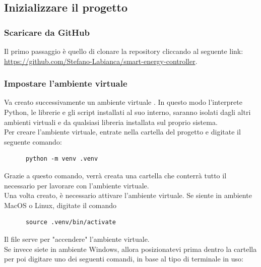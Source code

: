 \documentclass[12pt, letterpaper]{article}
\begin{document}
\subsection{Inizializzare il progetto}

\subsubsection{Scaricare da GitHub}

Il primo passaggio è quello di clonare la repository cliccando al seguente link:
\url{https://github.com/Stefano-Labianca/smart-energy-controller}. \\

\subsubsection{Impostare l'ambiente virtuale}

\noindent Va creato successivamente un ambiente virtuale \cite{create-venv}. In questo modo l'interprete Python,
le librerie e gli script installati al suo interno, saranno isolati dagli altri ambienti
virtuali e da qualsiasi libreria installata sul proprio sistema. \\

\noindent Per creare l'ambiente virtuale, entrate nella cartella del progetto e
digitate il seguente comando:

\begin{verbatim}
      python -m venv .venv
\end{verbatim}


\noindent Grazie a questo comando, verrà creata una cartella  che conterrà tutto il
necessario per lavorare con l'ambiente virtuale. \\

\noindent Una volta creato, è necessario attivare l'ambiente virtuale.
Se siente in ambiente MacOS o Linux, digitate il comando

\begin{verbatim}
      source .venv/bin/activate
\end{verbatim}

\noindent Il file  serve per "accendere" l'ambiente virtuale. \\

\noindent Se invece siete in ambiente Windows, allora posizionatevi prima dentro la cartella
 per poi  digitare uno dei seguenti comandi, in base al tipo di terminale in uso:
\end{document}
